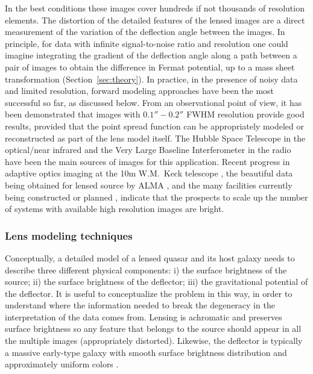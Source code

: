 In the best conditions these images cover hundreds if not thousands of
resolution elements. The distortion of the detailed features of the
lensed images are a direct measurement of the variation of the
deflection angle between the images.  In principle, for data with
infinite signal-to-noise ratio and resolution one could imagine
integrating the gradient of the deflection angle along a path between a
pair of images to obtain the difference in Fermat potential,
up to a mass sheet transformation (Section~\ref{sec:theory}).
In practice, in the presence of noisy data and limited resolution,
forward modeling approaches have been the most successful so far, as
discussed below. From an observational point of view, it has been
demonstrated that images with $0.1''-0.2''$ FWHM resolution provide
good results, provided that the point spread function can be
appropriately modeled or reconstructed as part of the lens model
itself. The Hubble Space Telescope in the optical/near infrared
\citep{Suy++10,Suy++13,Suy++14,BirrerEtal2015} and the Very Large Baseline
Interferometer in the radio \citep{WBB04} have been the main sources
of images for this application. Recent progress in adaptive optics
imaging at the 10m W.M.~Keck telescope \citep{Che++16}, the beautiful data being
obtained for lensed source by ALMA \citep{Hez++13a}, and the many
facilities currently being constructed or planned \citep{Men++15},
indicate that the prospects to scale up the number of systems with
available high resolution images are bright.


\subsubsection{Lens modeling techniques}

Conceptually, a detailed model of a lensed quasar and its host galaxy
needs to describe three different physical components: i) the surface
brightness of the source; ii) the surface brightness of the deflector;
iii) the gravitational potential of the deflector. It is useful to
conceptualize the problem in this way, in order to understand where
the information needed to break the degeneracy in the interpretation
of the data comes from. Lensing is achromatic and preserves surface
brightness so any feature that belongs to the source \cite[including
in line of sight velocity][]{Hez++13} should appear in all the
multiple images (appropriately distorted). Likewise, the deflector is
typically a massive early-type galaxy with smooth surface brightness
distribution and approximately uniform colors \cite[except for dust,
see, e.g.][]{Suy++10}.

